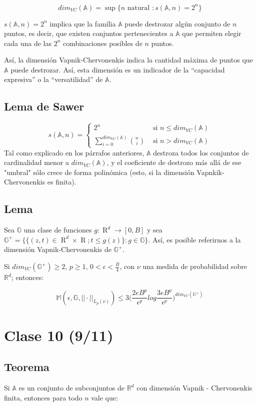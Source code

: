 \documentclass[12pt, a4paper]{article}
\begin{document}
$$dim_ {VC}(\mathds{A}) = \mathop{sup} \big \{ n \text{ natural }: s(\mathds{A},n)=2^n \big \}$$

$s(\mathds{A},n)=2^n$ implica que la família $\mathds{A}$ puede destrozar algún conjunto de $n$ puntos, es decir, que existen conjuntos pertenecientes a $\mathds{A}$ que permiten elegir cada una de las $2^n$ combinaciones posibles de $n$ puntos.

Así, la dimensión Vapnik-Chervonenkis indica la cantidad máxima de puntos que $\mathds{A}$ puede destrozar. Así, esta dimensión es un indicador de la ``capacidad expresiva'' o la ``versatilidad'' de $\mathds{A}$.

\subsection{Lema de Sawer}

$$
s(\mathds{A},n)=\begin{cases}
  2^n & \text{ si } n\leq dim_{VC}(\mathds{A}) \\
  \sum_{i=0}^{dim_{VC}(\mathds{A})} \binom{n}{i} & \text{ si } n > dim_{VC}(\mathds{A})
\end{cases}
$$
Tal como explicado en los párrafos anteriores, $\mathds{A}$ destroza todos los conjuntos de cardinalidad menor a $dim_{VC}(\mathds{A})$, y el coeficiente de destrozo más allá de ese "umbral" sólo crece de forma polinómica (esto, si la dimensión Vapnkik-Chervonenkis es finita).

\subsection{Lema}
Sea $\mathds{G}$ una clase de funciones $g:\mathop{R}^d \rightarrow [0,B]$ y sea $\mathds{G}^{+} = \big \{ \{ (z,t)\in \mathop{R}^d \times \mathop{R}; t\leq g(z) \}: g\in\mathds{G} \big \}$. Así, es posible referirnos a la dimensión Vapnik-Chervonenkis de $\mathds{G}^{+}$. 

Si $dim_{VC}(\mathds{G}^{+}) \geq 2$, $p\geq 1$, $0<\epsilon<\frac{B}{4}$, con $\nu$ una medida de probabilidad sobre $\mathds{R}^d$; entonces:

$$
\mathds{M}(\epsilon,\mathds{G},||\cdot||_{L_p(\nu)})\leq 3 \bigg( \frac{2eB^p}{\epsilon^p} log \frac{3eB^p}{\epsilon^p} \bigg)^{dim_{VC}(\mathds{G}^{+})}
$$
\section{Clase 10 (9/11)}
\subsection{Teorema}
Si $\mathds{A}$ es un conjunto de subconjuntos de $\mathds{R}^d$ con dimensión Vapnik - Chervonenkis finita, entonces para todo $n$ vale que:
\end{document}
